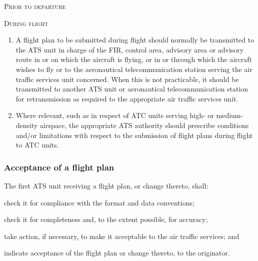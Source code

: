 \documentclass[../vATM.tex]{subfiles}
\begin{document}
    \begin{enumeratesc}
        \item \textsc{Prior to departure}
        \begin{enumempty}[labelindent=\parindent]
            \item {}
        \end{enumempty}

        \item \textsc{During flight}
        \begin{enumerate}
            \item A flight plan to be submitted during flight should normally be transmitted to the ATS unit in charge of the FIR, control area, advisory area or advisory route in or on which the aircraft is flying, or in or through which the aircraft wishes to fly or to the aeronautical telecommunication station serving the air traffic services unit concerned. When this is not practicable, it should be transmitted to another ATS unit or aeronautical telecommunication station for retransmission as required to the appropriate air traffic services unit.
            \item Where relevant, such as in respect of ATC units serving high- or medium-density airspace, the appropriate ATS authority should prescribe conditions and/or limitations with respect to the submission of flight plans during flight to ATC units.
        \end{enumerate}
    \end{enumeratesc}

    \subsubsection{Acceptance of a flight plan}

    The first ATS unit receiving a flight plan, or change thereto, shall:

    \begin{enumalph}
        \item check it for compliance with the format and data conventions;
        \item check it for completeness and, to the extent possible, for accuracy;
        \item take action, if necessary, to make it acceptable to the air traffic services; and
        \item indicate acceptance of the flight plan or change thereto, to the originator.
    \end{enumalph}
\end{document}
